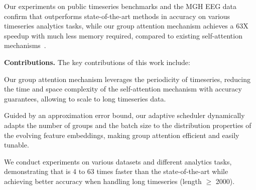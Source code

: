 Our experiments on public timeseries benchmarks and the MGH EEG data~\cite{DBLP:journals/pvldb/CaoTAJYLGSBSCWM19} confirm that \system outperforms  state-of-the-art methods in accuracy on various timeseries analytics tasks, while our group attention mechanism achieves a 63X speedup with much less memory required, compared to existing self-attention mechanisms~\cite{DBLP:conf/nips/VaswaniSPUJGKP17,choromanski2020rethinking,wang2020linformer}.

\noindent\textbf{Contributions.} The key contributions of this work include:

\begin{compactitem}


\item Our group attention mechanism leverages the periodicity of timeseries, reducing the time and space complexity of the self-attention mechanism with accuracy guarantees, allowing \system to scale to long timeseries data.

\item Guided by an approximation error bound, our adaptive scheduler dynamically adapts the number of groups and the batch size to the distribution properties of the evolving feature embeddings, making group attention efficient and easily tunable.

\item We conduct experiments on various datasets and different analytics tasks, demonstrating that \system is 4 to 63 times faster than the state-of-the-art while achieving better accuracy when handling long timeseries (length $\geq$ 2000).


\end{compactitem}
